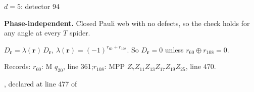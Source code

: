 \label{d5_det094}
{\Large $d=5$: detector 94}\par
\textbf{Phase-independent.} Closed Pauli web with no defects, so the check holds for any angle at every $T$ spider.
\begin{center}
\end{center}
\vspace{-1mm}
$D_{\boldsymbol r}=\lambda(\boldsymbol r)\,D_{\boldsymbol r}$, \quad $\lambda(\boldsymbol r)=(-1)^{r_{60}+r_{108}}$. \qquad So $D_{\boldsymbol r}=0$ unless $r_{60}\oplus r_{108}=0$.
\par\smallskip\begin{minipage}{.98\linewidth}\small Records: $r_{60}$: M $q_{20}$, line 361;\quad $r_{108}$: MPP $Z_{7}Z_{11}Z_{13}Z_{17}Z_{19}Z_{25}$, line 470.\end{minipage}
\vfill
{\footnotesize\texttt{}, declared at line 477 of \texttt{}}
\newpage

